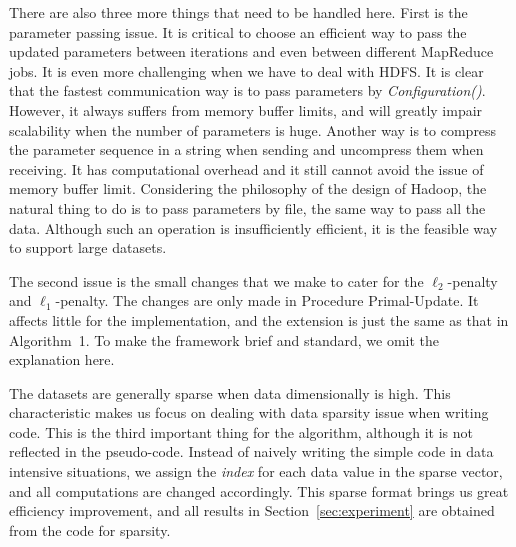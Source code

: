 \documentclass[10pt, conference, compsocconf]{IEEEtran}
\begin{document}
There are also three more things that need to be handled here.
First is the parameter passing issue. It is critical to choose an efficient way to pass the updated parameters between iterations and even between different MapReduce jobs.
It is even more challenging when we have to deal with HDFS. It is clear that the fastest communication way is to pass parameters by \textit{Configuration()}.
However, it always suffers from memory buffer limits, and will greatly impair scalability when the number of parameters is huge.
Another way is to compress the parameter sequence in a string when sending and uncompress them when receiving. It has computational overhead and it still cannot avoid the issue of memory buffer limit.
Considering the philosophy of the design of Hadoop, the natural thing to do is to pass parameters by file, the same way to pass all the data.
Although such an operation is insufficiently efficient, it is the feasible way to support large datasets.

The second issue is the small changes that we make to cater for the $\ell_2$-penalty and $\ell_1$-penalty. The changes are only made in Procedure Primal-Update.
It affects little for the implementation, and the extension is just the same as that in Algorithm~1.
To make the framework brief and standard, we omit the explanation here.

The datasets are generally sparse when data dimensionally is high. This characteristic makes us focus on dealing with data sparsity issue when writing code.
This is the third important thing for the algorithm, although it is not reflected in the pseudo-code.
Instead of naively writing the simple code in data intensive situations, we assign the \textit{index} for each data value in the sparse vector, and all computations are changed accordingly.
This sparse format brings us great efficiency improvement, and all results in Section~\ref{sec:experiment} are obtained from the code for sparsity.
\end{document}
